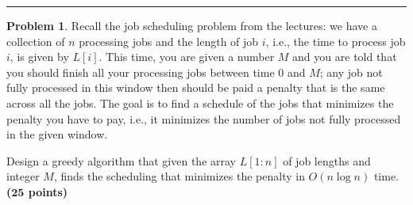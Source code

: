 \documentclass{article}
\theoremstyle{definition}
\newtheorem{problem}{Problem}
\def\fline{\rule{0.75\linewidth}{0.5pt}}
\newcommand{\finishline}{\begin{center}\fline\end{center}}
\newcommand{\grade}[1]{\hfill{\textbf{($\mathbf{#1}$ points)}}}
\begin{document}
\finishline




\begin{problem}
	Recall the job scheduling problem from the lectures: we have a collection of $n$ processing jobs and the length of job $i$, i.e., the time to process job $i$, is given by $L[i]$. This time, you are given a number $M$ and you are told that you should finish all your processing jobs between time $0$ and $M$; any job not fully processed in this window then should be paid a penalty that is the same across all the jobs. The goal is to find a schedule of the jobs that minimizes the penalty you have to pay, i.e., it minimizes the number of jobs not fully processed in the given window. 
	
	Design a greedy algorithm that given the array $L[1:n]$ of job lengths and integer $M$, finds the scheduling that minimizes the penalty in $O(n\log{n})$ time. \grade{25}


\bigskip


\end{problem}
\end{document}
